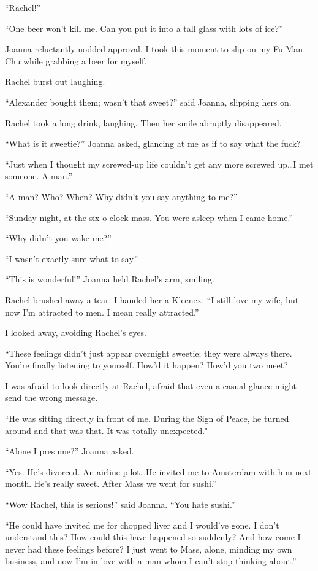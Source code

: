 ``Rachel!''

``One beer won't kill me. Can you put it into a tall glass with lots of
ice?''

Joanna reluctantly nodded approval. I took this moment to slip on my Fu
Man Chu while grabbing a beer for myself.

Rachel burst out laughing.

``Alexander bought them; wasn't that sweet?'' said Joanna, slipping hers
on.

Rachel took a long drink, laughing. Then her smile abruptly disappeared.

``What is it sweetie?'' Joanna asked, glancing at me as if to say what
the fuck?

``Just when I thought my screwed-up life couldn't get any more screwed
up\ldots I met someone. A man.''

``A man? Who? When? Why didn't you say anything to me?''

``Sunday night, at the six-o-clock mass. You were asleep when I came
home.''

``Why didn't you wake me?''

``I wasn't exactly sure what to say.''

``This is wonderful!'' Joanna held Rachel's arm, smiling.

Rachel brushed away a tear. I handed her a Kleenex. ``I still love my
wife, but now I'm attracted to men. I mean really attracted.''

I looked away, avoiding Rachel's eyes.

``These feelings didn't just appear overnight sweetie; they were always
there. You're finally listening to yourself. How'd it happen? How'd you
two meet?

I was afraid to look directly at Rachel, afraid that even a casual
glance might send the wrong message.

``He was sitting directly in front of me. During the Sign of Peace, he
turned around and that was that. It was totally unexpected."

``Alone I presume?'' Joanna asked.

``Yes. He's divorced. An airline pilot\ldots He invited me to Amsterdam
with him next month. He's really sweet. After Mass we went for sushi.''

``Wow Rachel, this is serious!'' said Joanna. ``You hate sushi.''

``He could have invited me for chopped liver and I would've gone. I
don't understand this? How could this have happened so suddenly? And how
come I never had these feelings before? I just went to Mass, alone,
minding my own business, and now I'm in love with a man whom I can't
stop thinking about.''

